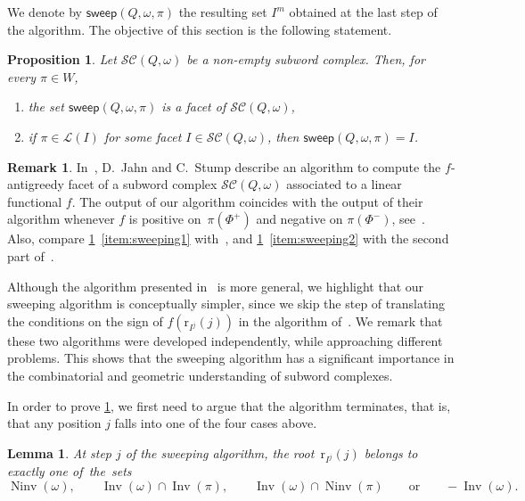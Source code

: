 \documentclass[reqno]{amsart}
\newtheorem{proposition}[theorem]{Proposition}
\newtheorem{lemma}[theorem]{Lemma}
\theoremstyle{definition}
\newtheorem{remark}[theorem]{Remark}
\DeclareMathOperator{\Inv}{Inv} %
\DeclareMathOperator{\Ninv}{Ninv} %
\newcommand{\linearExtensions}{\mathcal{L}} %
\newcommand{\subwordComplex}{\mathcal{SC}} %
\newcommand{\rootFunction}[2]{\mathrm{r}_{#1}(#2)} %
\newcommand{\sweepingAlgorithm}{\mathsf{sweep}} %
\begin{document}
We denote by $\sweepingAlgorithm(Q,\omega,\pi)$ the resulting set $I^m$ obtained at the last step of the algorithm.
The objective of this section is the following statement.

\begin{proposition}
\label{prop:sweeping}
Let $\subwordComplex(Q,\omega)$ be a non-empty subword complex. Then, for every $\pi \in W$, 
\begin{enumerate}
\item the set $\sweepingAlgorithm(Q,\omega,\pi)$ is a facet of $\subwordComplex(Q,\omega)$, \label{item:sweeping1}
\item if $\pi\in \linearExtensions(I)$ for some facet $I\in \subwordComplex(Q,\omega)$, then $\sweepingAlgorithm(Q,\omega,\pi) = I$. \label{item:sweeping2}
\end{enumerate}
\end{proposition}

\begin{remark}
\label{rem:sweepJahnStump}
In~\cite[Sect.~3.3]{JahnStump}, D.~Jahn and C.~Stump describe an algorithm to compute the $f$-antigreedy facet of a subword complex $\subwordComplex(Q,\omega)$ associated to a linear functional $f$.  
The output of our algorithm coincides with the output of their algorithm whenever $f$ is positive on~$\pi(\Phi^+)$ and negative on $\pi(\Phi^-)$, see~\cite[Prop.~4.12]{JahnStump}.
Also, compare \cref{prop:sweeping}~\eqref{item:sweeping1} with~\cite[Thm.~3.17 (a)]{JahnStump}, and \cref{prop:sweeping}~\eqref{item:sweeping2} with the second part of~\cite[Prop.~4.12]{JahnStump}.

Although the algorithm presented in~\cite{JahnStump} is more general, we highlight that our sweeping algorithm is conceptually simpler, since we skip the step of translating the conditions on the sign of $f(\rootFunction{I^j}{j})$ in the algorithm of~\cite{JahnStump}.
We remark that these two algorithms were developed independently, while approaching different problems.
This shows that the sweeping algorithm has a significant importance in the combinatorial and geometric understanding of subword complexes.  
\end{remark}

In order to prove \cref{prop:sweeping}, we first need to argue that the algorithm terminates, that is, that any position $j$ falls into one of the four cases above.

\begin{lemma}
\label{lem:sweeping1}
At step $j$ of the sweeping algorithm, the root~$\rootFunction{I^j}{j}$ belongs to exactly one of~the~sets
\[
\Ninv(\omega),
\qquad
\Inv(\omega) \cap \Inv(\pi),
\qquad
\Inv(\omega) \cap \Ninv(\pi)
\qquad\text{or}\qquad
-\Inv(\omega).
\]
\end{lemma}
\end{document}
